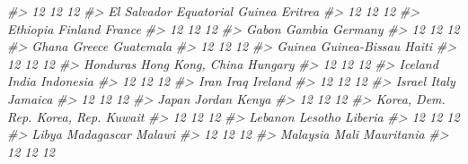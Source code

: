 \documentclass[
]{book}
\newenvironment{Shaded}{\begin{snugshade}}{\end{snugshade}}
\newcommand{\CommentTok}[1]{\textcolor[rgb]{0.56,0.35,0.01}{\textit{#1}}}
\begin{document}
\begin{Shaded}
\begin{Highlighting}[]
\CommentTok{#>                       12                       12                       12 }
\CommentTok{#>              El Salvador        Equatorial Guinea                  Eritrea }
\CommentTok{#>                       12                       12                       12 }
\CommentTok{#>                 Ethiopia                  Finland                   France }
\CommentTok{#>                       12                       12                       12 }
\CommentTok{#>                    Gabon                   Gambia                  Germany }
\CommentTok{#>                       12                       12                       12 }
\CommentTok{#>                    Ghana                   Greece                Guatemala }
\CommentTok{#>                       12                       12                       12 }
\CommentTok{#>                   Guinea            Guinea-Bissau                    Haiti }
\CommentTok{#>                       12                       12                       12 }
\CommentTok{#>                 Honduras         Hong Kong, China                  Hungary }
\CommentTok{#>                       12                       12                       12 }
\CommentTok{#>                  Iceland                    India                Indonesia }
\CommentTok{#>                       12                       12                       12 }
\CommentTok{#>                     Iran                     Iraq                  Ireland }
\CommentTok{#>                       12                       12                       12 }
\CommentTok{#>                   Israel                    Italy                  Jamaica }
\CommentTok{#>                       12                       12                       12 }
\CommentTok{#>                    Japan                   Jordan                    Kenya }
\CommentTok{#>                       12                       12                       12 }
\CommentTok{#>         Korea, Dem. Rep.              Korea, Rep.                   Kuwait }
\CommentTok{#>                       12                       12                       12 }
\CommentTok{#>                  Lebanon                  Lesotho                  Liberia }
\CommentTok{#>                       12                       12                       12 }
\CommentTok{#>                    Libya               Madagascar                   Malawi }
\CommentTok{#>                       12                       12                       12 }
\CommentTok{#>                 Malaysia                     Mali               Mauritania }
\CommentTok{#>                       12                       12                       12 }

\end{Highlighting}
\end{Shaded}
\end{document}
